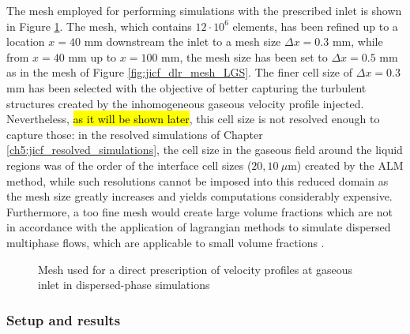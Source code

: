 The mesh employed for performing simulations with the prescribed inlet is shown in Figure \ref{fig:mesh_reduced_inlet}. The mesh, which contains $12 \cdot 10^6$ elements, has been refined up to a location $x = 40$ mm downstream the inlet to a mesh size $\Delta x = 0.3$ mm, while from $x = 40$ mm up to $x = 100$ mm, the mesh size has been set to $\Delta x = 0.5$ mm as in the mesh of Figure \ref{fig:jicf_dlr_mesh_LGS}. The finer cell size of $\Delta x = 0.3$ mm has been selected  with the objective of better capturing the turbulent structures created by the inhomogeneous gaseous velocity profile injected. Nevertheless, \hl{as it will be shown later}, this cell size is not resolved enough to capture those: in the resolved simulations of Chapter \ref{ch5:jicf_resolved_simulations}, the cell size in the gaseous field around the liquid regions was of the order of the interface cell sizes ($20, 10~\mu$m) created by the ALM method, while such resolutions cannot be imposed into this reduced domain as the mesh size greatly increases and yields computations considerably expensive. Furthermore, a too fine mesh would create large volume fractions which are not in accordance with the application of lagrangian methods to simulate dispersed multiphase flows, which are applicable to small volume fractions .

\begin{figure}[h!]	
	\centering	
	\caption{Mesh used for a direct prescription of velocity profiles at gaseous inlet in dispersed-phase simulations}
	\label{fig:mesh_reduced_inlet}
\end{figure}



\subsubsection{Setup and results}

